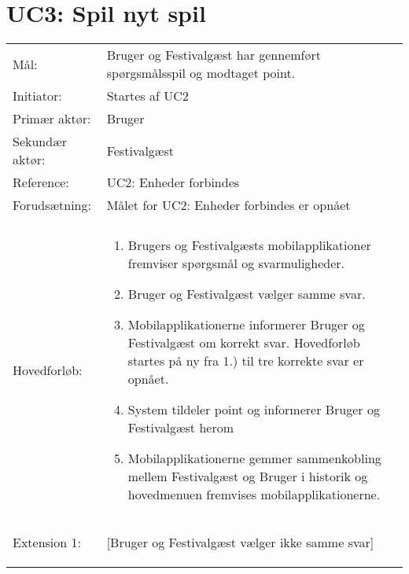 \section{UC3: Spil nyt spil}
\begin{tabular}{ >{\raggedleft} p{3cm} | p{12cm} }
Mål: & Bruger og Festivalgæst har gennemført spørgsmålsspil og modtaget point. \\
Initiator: & Startes af UC2 \\
Primær aktør: & Bruger \\
Sekundær aktør: & Festivalgæst  \\
Reference: & UC2: Enheder forbindes \\
Forudsætning: & Målet for UC2: Enheder forbindes er opnået
 \\
 & \\
Hovedforløb:  & \begin{enumerate}[label=\arabic*.),itemjoin={\newline},topsep=0pt,partopsep=0pt,itemsep=0pt,leftmargin=*]   
\item Brugers og Festivalgæsts mobilapplikationer fremviser spørgsmål og svarmuligheder.
\item Bruger og Festivalgæst vælger samme svar.   
\item Mobilapplikationerne informerer Bruger og Festivalgæst om korrekt svar. Hovedforløb startes på ny fra 1.) til tre korrekte svar er opnået.
\item System tildeler point og informerer Bruger og Festivalgæst herom 
\newline
\item Mobilapplikationerne gemmer sammenkobling mellem Festivalgæst og Bruger i historik og hovedmenuen fremvises mobilapplikationerne.
\end{enumerate}\\
Extension 1: &  [Bruger og Festivalgæst vælger ikke samme svar]
\vspace{2 mm}
\begin{enumerate}[label=\arabic*.),itemjoin={\newline},topsep=0pt,partopsep=0pt,itemsep=0pt,leftmargin=*]   

\end{enumerate}
\end{tabular}
